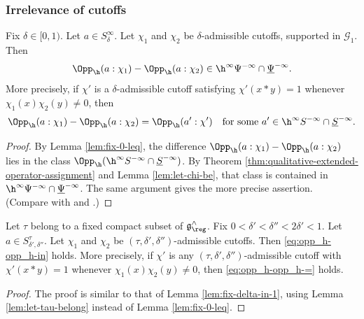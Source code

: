 \subsubsection{Irrelevance of cutoffs}
\begin{lemma}\label{lem:fix-delta-in-1}
  Fix $\delta \in [0,1)$.  Let $a \in S_\delta^\infty$.  Let $\chi_1$ and $\chi_2$ be $\delta$-admissible cutoffs, supported in $\mathcal{G}_1$.  Then
  \begin{equation}\label{eq:opp_h-opp_h-in}
    \Opp_{\h}(a:\chi_1) - \Opp_{\h}(a:\chi_2) \in \h^\infty \Psi^{-\infty} \cap \underline{\Psi }^{-\infty}.
  \end{equation}
  More precisely, if $\chi '$ is a $\delta$-admissible cutoff satisfying $\chi ' (x \ast y) = 1$ whenever $\chi_1(x) \chi_2(y) \neq 0$, then
  \begin{equation}\label{eq:opp_h-opp_h-=}
    \Opp_{\h}(a:\chi_1) - \Opp_{\h}(a:\chi_2) = \Opp_{\h}(a' : \chi ') \quad \text{for some $a' \in \h^\infty S^{-\infty} \cap \underline{S}^{-\infty}$.}
  \end{equation}
\end{lemma}
\begin{proof}
  By Lemma \ref{lem:fix-0-leq}, the difference $\Opp_{\h}(a:\chi_1) - \Opp_{\h}(a:\chi_2)$ lies in the class $\Opp_{\h}(\h^\infty S^{-\infty} \cap \underline{S}^{-\infty})$.  By Theorem \ref{thm:qualitative-extended-operator-assignment} and Lemma \ref{lem:let-chi-be}, that class is contained in $\h^\infty \Psi^{-\infty} \cap \underline{\Psi}^{-\infty}$.  The same argument gives the more precise assertion.  (Compare with \cite[Lemma 10.7]{2020arXiv201202187N} and \cite[\S5.4]{nelson-venkatesh-1}.)
\end{proof}

\begin{lemma}\label{lem:fix-delta-in-2}
  Let $\tau$ belong to a fixed compact subset of $\mathfrak{g}^\wedge_{\reg}$.  Fix $0 < \delta ' < \delta '' < 2 \delta ' < 1$.  Let $a \in S_{\delta', \delta ''}^{\tau}$.  Let $\chi_1$ and $\chi_2$ be $(\tau, \delta ', \delta '')$-admissible cutoffs.  Then \eqref{eq:opp_h-opp_h-in} holds.  More precisely, if $\chi '$ is any $(\tau, \delta ', \delta '')$-admissible cutoff with $\chi ' (x \ast y) = 1$ whenever $\chi_1(x) \chi_2(y) \neq 0$, then \eqref{eq:opp_h-opp_h-=} holds.
\end{lemma}
\begin{proof}
  The proof is similar to that of Lemma \ref{lem:fix-delta-in-1}, using Lemma \ref{lem:let-tau-belong} instead of Lemma \ref{lem:fix-0-leq}.
\end{proof}



